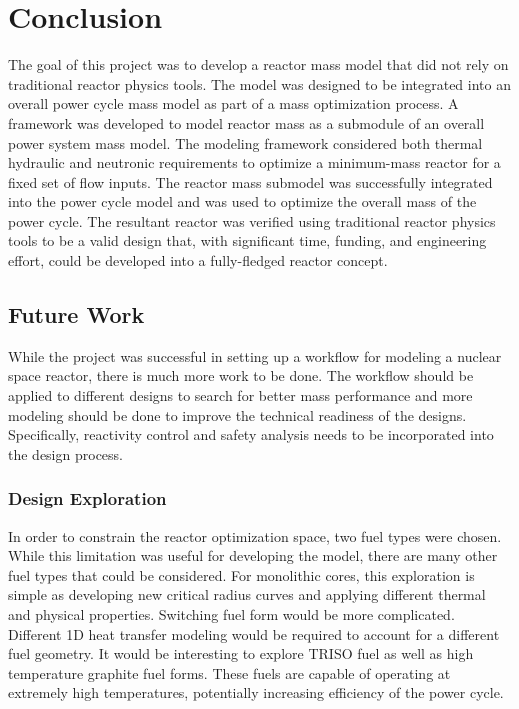 \chapter{Conclusion}
The goal of this project was to develop a reactor mass model that did not rely
on traditional reactor physics tools. The model was designed to be integrated
into an overall power cycle mass model as part of a mass optimization process. A
framework was developed to model reactor mass as a submodule of an overall
power system mass model. The modeling framework considered both thermal
hydraulic and neutronic requirements to optimize a minimum-mass reactor for a
fixed set of flow inputs. The reactor mass submodel was successfully integrated
into the power cycle model and was used to optimize the overall mass of the
power cycle. The resultant reactor was verified using traditional reactor
physics tools to be a valid design that, with significant time, funding, and
engineering effort, could be developed into a fully-fledged reactor concept.

\section{Future Work}
While the project was successful in setting up a workflow for modeling a nuclear
space reactor, there is much more work to be done. The workflow should be
applied to different designs to search for better mass performance and more
modeling should be done to improve the technical readiness of the designs.
Specifically, reactivity control and safety analysis needs to be incorporated
into the design process.

\subsection{Design Exploration}
In order to constrain the reactor optimization space, two fuel types were
chosen. While this limitation was useful for developing the model, 
there are many other fuel types that could be considered. For monolithic
cores, this exploration is simple as developing new critical radius curves and
applying different thermal and physical properties. Switching fuel form would be
more complicated. Different 1D heat transfer modeling would be required to
account for a different fuel geometry. It would be interesting to explore
TRISO fuel as well as high temperature graphite fuel forms. These fuels are
capable of operating at extremely high temperatures, potentially increasing
efficiency of the power cycle.

